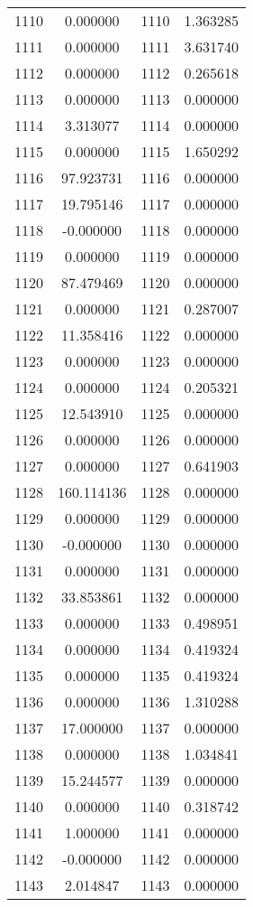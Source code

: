 \documentclass[12pt]{article}
\begin{document}
\begin{longtable}{@{}cccc@{}}
1110 & 0.000000 & 1110 & 1.363285 \\
1111 & 0.000000 & 1111 & 3.631740 \\
1112 & 0.000000 & 1112 & 0.265618 \\
1113 & 0.000000 & 1113 & 0.000000 \\
1114 & 3.313077 & 1114 & 0.000000 \\
1115 & 0.000000 & 1115 & 1.650292 \\
1116 & 97.923731 & 1116 & 0.000000 \\
1117 & 19.795146 & 1117 & 0.000000 \\
1118 & -0.000000 & 1118 & 0.000000 \\
1119 & 0.000000 & 1119 & 0.000000 \\
1120 & 87.479469 & 1120 & 0.000000 \\
1121 & 0.000000 & 1121 & 0.287007 \\
1122 & 11.358416 & 1122 & 0.000000 \\
1123 & 0.000000 & 1123 & 0.000000 \\
1124 & 0.000000 & 1124 & 0.205321 \\
1125 & 12.543910 & 1125 & 0.000000 \\
1126 & 0.000000 & 1126 & 0.000000 \\
1127 & 0.000000 & 1127 & 0.641903 \\
1128 & 160.114136 & 1128 & 0.000000 \\
1129 & 0.000000 & 1129 & 0.000000 \\
1130 & -0.000000 & 1130 & 0.000000 \\
1131 & 0.000000 & 1131 & 0.000000 \\
1132 & 33.853861 & 1132 & 0.000000 \\
1133 & 0.000000 & 1133 & 0.498951 \\
1134 & 0.000000 & 1134 & 0.419324 \\
1135 & 0.000000 & 1135 & 0.419324 \\
1136 & 0.000000 & 1136 & 1.310288 \\
1137 & 17.000000 & 1137 & 0.000000 \\
1138 & 0.000000 & 1138 & 1.034841 \\
1139 & 15.244577 & 1139 & 0.000000 \\
1140 & 0.000000 & 1140 & 0.318742 \\
1141 & 1.000000 & 1141 & 0.000000 \\
1142 & -0.000000 & 1142 & 0.000000 \\
1143 & 2.014847 & 1143 & 0.000000 \\

\end{longtable}
\end{document}
